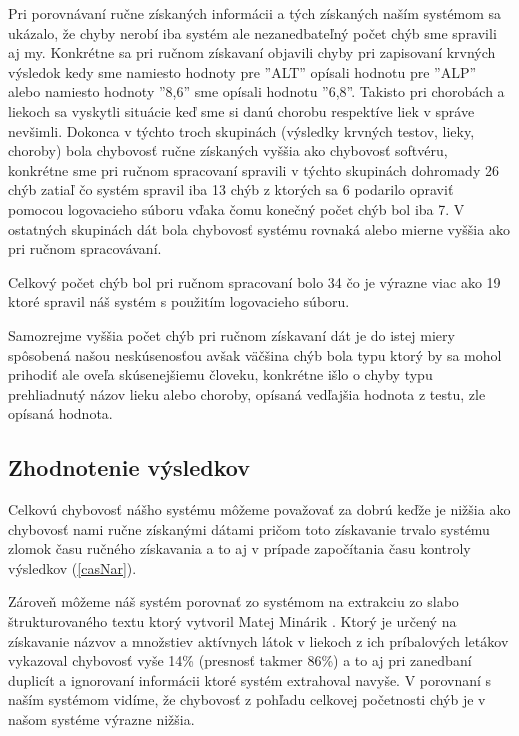Pri porovnávaní ručne získaných informácii a tých získaných naším systémom sa ukázalo, že chyby nerobí iba systém ale nezanedbateľný počet chýb sme spravili aj my. Konkrétne sa pri ručnom získavaní objavili chyby pri zapisovaní krvných výsledok kedy sme namiesto hodnoty pre ''ALT'' opísali hodnotu pre ''ALP'' alebo namiesto hodnoty ''8,6'' sme opísali hodnotu ''6,8''. Takisto pri chorobách a liekoch sa vyskytli situácie keď sme si danú chorobu respektíve liek v správe nevšimli. Dokonca v týchto troch skupinách (výsledky krvných testov, lieky, choroby) bola chybovosť ručne získaných vyššia ako chybovosť softvéru, konkrétne sme pri ručnom spracovaní spravili v týchto skupinách dohromady 26 chýb zatiaľ čo systém spravil iba 13 chýb z ktorých sa 6 podarilo opraviť pomocou logovacieho súboru vďaka čomu konečný počet chýb bol iba 7. V ostatných skupinách dát bola chybovosť systému rovnaká alebo mierne vyššia ako pri ručnom spracovávaní. 

Celkový počet chýb bol pri ručnom spracovaní bolo 34 čo je výrazne viac ako 19 ktoré spravil náš systém s použitím logovacieho súboru.  

Samozrejme vyššia počet chýb pri ručnom získavaní dát je do istej miery spôsobená našou neskúsenosťou avšak väčšina chýb bola typu ktorý by sa mohol prihodiť ale oveľa skúsenejšiemu človeku, konkrétne išlo o chyby typu prehliadnutý názov lieku alebo choroby, opísaná vedľajšia hodnota z testu, zle opísaná hodnota.

 
\subsection{Zhodnotenie výsledkov}

Celkovú chybovosť nášho systému môžeme považovať za dobrú keďže je nižšia ako chybovosť nami ručne získanými dátami pričom toto získavanie trvalo systému zlomok času ručného získavania a to aj v prípade započítania času kontroly výsledkov (\ref{casNar}).

Zároveň môžeme náš systém porovnať zo systémom na extrakciu zo slabo štrukturovaného textu ktorý vytvoril Matej Minárik \cite{extrSlabo}. Ktorý je určený na získavanie názvov a množstiev aktívnych látok v liekoch z ich príbalových letákov vykazoval chybovosť vyše 14\% (presnosť takmer 86\%) a to aj pri zanedbaní duplicít a ignorovaní informácii ktoré systém extrahoval navyše. V porovnaní s naším systémom vidíme, že chybovosť z pohľadu celkovej početnosti chýb je v našom systéme výrazne nižšia. 



